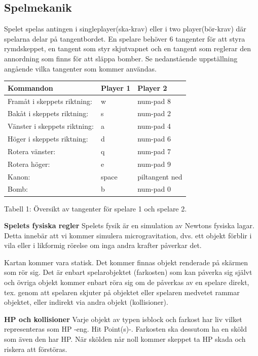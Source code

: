 \documentclass{TDP005mall}
\begin{document}
\subsection{Spelmekanik}
Spelet spelas antingen i singleplayer(ska-krav) eller i two player(bör-krav) där
spelarna delar på tangentbordet. 
En spelare behöver 6 tangenter för att styra rymdskeppet, en tangent som styr
skjutvapnet och en tangent som reglerar den annordning som finns för att släppa
bomber. Se nedanstående
uppställning angående vilka tangenter som kommer användas. 

\begin{table}[!h]
\begin{tabularx}{\linewidth}{|X|l|l|}
\hline  
Kommandon  & Player 1 & Player 2 \\\hline
Framåt i skeppets riktning: & w & num-pad 8 \\\hline
Bakåt i skeppets riktning: & s & num-pad 2 \\\hline
Vänster i skeppets riktning: & a & num-pad 4 \\\hline
Höger i skeppets riktning: & d & num-pad 6 \\\hline
Rotera vänster: & q & num-pad 7 \\\hline
Rotera höger: & e & num-pad 9 \\\hline
Kanon: & space & piltangent ned \\\hline
Bomb: & b & num-pad 0 \\\hline

\end{tabularx}
\end{table}
Tabell 1: Översikt av tangenter för spelare 1 och spelare 2.

\textbf{Spelets fysiska regler}
Spelets fysik är en simulation av Newtons fysiska lagar. 
Detta innebär att vi kommer simulera microgravitation, dvs. ett objekt förblir i
vila eller i likformig rörelse om inga andra krafter påverkar det.

Kartan kommer vara statisk. Det kommer finnas objekt renderade på skärmen som
rör sig. Det är enbart spelarobjektet (farkosten) som kan påverka sig självt och
övriga objekt kommer enbart röra sig om de påverkas av en spelare direkt, tex. 
genom att spelaren skjuter på objektet eller spelaren medvetet rammar objektet,
eller indirekt via andra objekt (kollisioner).

\textbf{HP och kollisioner}
Varje objekt av typen isblock och farkost har liv vilket representeras som 
HP -eng. Hit Point(s)-. Farkosten ska dessutom ha en sköld som även den har HP.
När skölden når noll kommer skeppet ta HP skada och riskera att förstöras.
\end{document}
